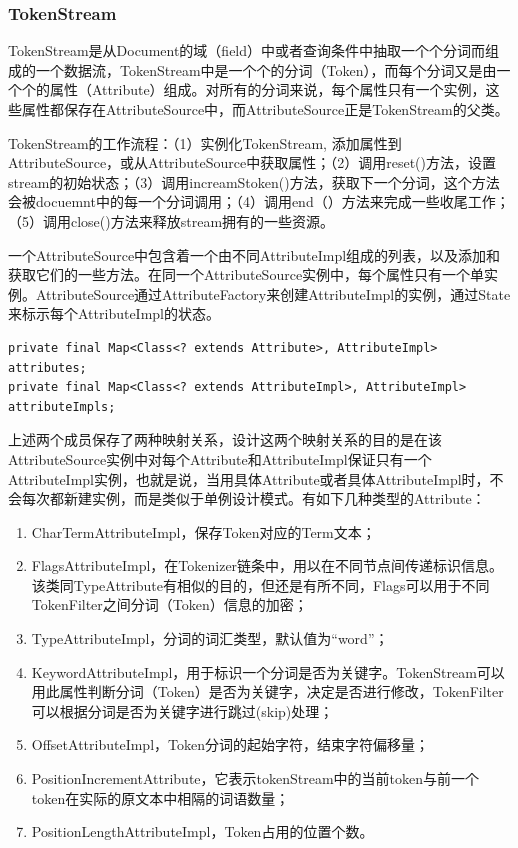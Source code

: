 \subsubsection{TokenStream}
\par TokenStream是从Document的域（field）中或者查询条件中抽取一个个分词而组成的一个数据流，TokenStream中是一个个的分词（Token），而每个分词又是由一个个的属性（Attribute）组成。对所有的分词来说，每个属性只有一个实例，这些属性都保存在AttributeSource中，而AttributeSource正是TokenStream的父类。
\par TokenStream的工作流程：（1）实例化TokenStream, 添加属性到AttributeSource，或从AttributeSource中获取属性；（2）调用reset()方法，设置stream的初始状态；（3）调用increamStoken()方法，获取下一个分词，这个方法会被docuemnt中的每一个分词调用；（4）调用end（）方法来完成一些收尾工作；（5）调用close()方法来释放stream拥有的一些资源。
\par 一个AttributeSource中包含着一个由不同AttributeImpl组成的列表，以及添加和获取它们的一些方法。在同一个AttributeSource实例中，每个属性只有一个单实例。AttributeSource通过AttributeFactory来创建AttributeImpl的实例，通过State来标示每个AttributeImpl的状态。
\begin{verbatim}
private final Map<Class<? extends Attribute>, AttributeImpl> attributes;
private final Map<Class<? extends AttributeImpl>, AttributeImpl> attributeImpls;
\end{verbatim}
\par 上述两个成员保存了两种映射关系，设计这两个映射关系的目的是在该AttributeSource实例中对每个Attribute和AttributeImpl保证只有一个AttributeImpl实例，也就是说，当用具体Attribute或者具体AttributeImpl时，不会每次都新建实例，而是类似于单例设计模式。有如下几种类型的Attribute：
\begin{enumerate}[(1)]
\item CharTermAttributeImpl，保存Token对应的Term文本；
\item FlagsAttributeImpl，在Tokenizer链条中，用以在不同节点间传递标识信息。该类同TypeAttribute有相似的目的，但还是有所不同，Flags可以用于不同TokenFilter之间分词（Token）信息的加密；
\item TypeAttributeImpl，分词的词汇类型，默认值为“word”；
\item KeywordAttributeImpl，用于标识一个分词是否为关键字。TokenStream可以用此属性判断分词（Token）是否为关键字，决定是否进行修改，TokenFilter可以根据分词是否为关键字进行跳过(skip)处理；
\item OffsetAttributeImpl，Token分词的起始字符，结束字符偏移量； 
\item PositionIncrementAttribute，它表示tokenStream中的当前token与前一个token在实际的原文本中相隔的词语数量；
\item PositionLengthAttributeImpl，Token占用的位置个数。
\end{enumerate}
